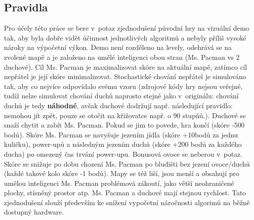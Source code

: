 \subsection{Pravidla}
Pro účely této práce se bere v potaz zjednodušení původní hry na vizuální demo tak, aby byla dobře vidět účinnost jednotlivých algoritmů a nebyly příliš vysoké nároky na výpočetní výkon. Demo není rozděleno na levely, odehrává se na zvolené mapě a je založeno na umělé inteligenci obou stran (Ms. Pacman vs 2 duchové). Cíl Ms. Pacman je maximalizovat skóre na aktuální mapě, zatímco cíl nepřátel je její skóre minimalizovat. Stochastické chování nepřátel je simulováno tak, aby co nejvíce odpovídalo svému vzoru (zdrojové kódy hry nejsou veřejné, tudíž nelze simulovat chování duchů naprosto stejně jako v originálu: chování duchů je tedy \textbf{náhodné}, avšak duchové dodržují např. následující pravidlo: nemohou jít zpět, pouze se otočit na křižovatce např. o 90 stupňů.). Duchové se snaží chytit a zabít Ms. Pacman. Pokud se jim to povede, hra končí (skóre -500 bodů). Skóre Ms. Pacman se navyšuje jezením jídla (skóre +10bodů za jednu kuličku), power-upů a následným jezením duchů (skóre +200 bodů za každého ducha) po omezený čas trvání power-upu. Bonusová ovoce se neberou v potaz. Skóre se snižuje po dobu chození Ms. Pacman po bludišti bez jezení ovoce/duchů (každé takové kolo skóre -1 bodů). Mapy se též liší, jsou menší a obsahují pro umělou inteligenci Ms. Pacman problémová zákoutí, jako větší neohraničené plochy, stísněný prostor atp. Ms. Pacman a duchové mají stejnou rychlost. Tato zjednodušení slouží především ke snížení vypočetní náročnosti algorimů na běžně dostupný hardware.

